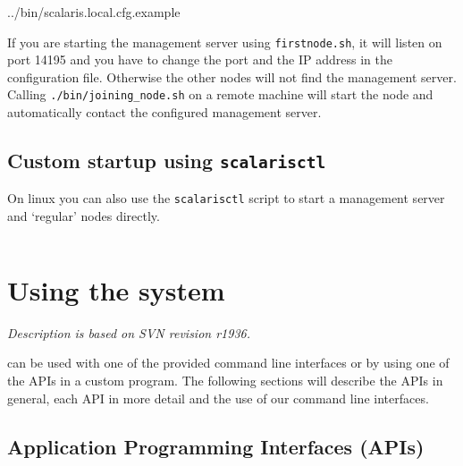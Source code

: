 \documentclass[a4paper]{scrreprt}
\newcommand{\codesnippet}[4][language=erlang]{
{%
\lstset{numbers=left}

{#4}
}
}
\newcommand{\code}[1]{\lstinline[basicstyle=\ttfamily]!#1!}
\newcommand{\filetitle}[1]{\hbox to \linewidth{~~File \code{#1:}\hfill}}
\newcommand{\svnrev}[1]
{\hfill\emph{Description is based on SVN revision #1.}\medskip}
\begin{document}
\codesnippet{scalaris.local.cfg}{local_cfg:distributed}{../bin/scalaris.local.cfg.example}

If you are starting the management server using \code{firstnode.sh}, it will
listen on port 14195 and you have to change the port and the IP address in the
configuration file. Otherwise the other nodes will not find the management
server. Calling \code{./bin/joining_node.sh} on a remote machine will start the
node and automatically contact the configured management server.




\section{Custom startup using \code{scalarisctl}}

On linux you can also use the \code{scalarisctl} script to start a
management server and `regular' nodes directly.
\begin{lstlisting}[language=sh]
%> ./bin/scalarisctl -h
\end{lstlisting}


\chapter{Using the system}
\label{chapter.systemuse}
\svnrev{r1936}

\scalaris{} can be used with one of the provided command line interfaces or
by using one of the APIs in a custom program. The following sections will
describe the APIs in general, each API in more detail and the use of our
command line interfaces.

\section{Application Programming Interfaces (APIs)}
\label{chapter.systemuse.apis}
\end{document}
